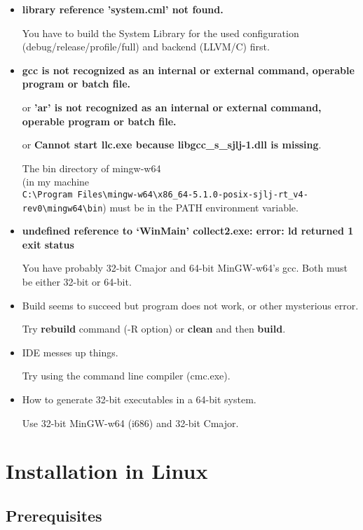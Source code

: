 \documentclass[oneside, a4paper, 11pt]{article}
\begin{document}
\begin{itemize}

\item
\textbf{library reference 'system.cml' not found.}

You have to build the System Library for the used configuration (debug/release/profile/full) and backend (LLVM/C) first.

\item

\textbf{gcc is not recognized as an internal or external command, operable program or batch file.}

or \textbf{'ar' is not recognized as an internal or external command, operable program or batch file.}

or \textbf{Cannot start llc.exe because libgcc\_s\_sjlj-1.dll is missing}.

The bin directory of mingw-w64\\
(in my machine\\
\verb|C:\Program Files\mingw-w64\x86_64-5.1.0-posix-sjlj-rt_v4-rev0\mingw64\bin|)
must be in the PATH environment variable.

\item
\textbf{undefined reference to `WinMain' collect2.exe: error: ld returned 1 exit status}

You have probably 32-bit Cmajor and 64-bit MinGW-w64's gcc.
Both must be either 32-bit or 64-bit.

\item
Build seems to succeed but program does not work, or other mysterious error.

Try \textbf{rebuild} command (-R option) or \textbf{clean} and then \textbf{build}.

\item
IDE messes up things.

Try using the command line compiler (cmc.exe).

\item
How to generate 32-bit executables in a 64-bit system.

Use 32-bit MinGW-w64 (i686) and 32-bit Cmajor.
\end{itemize}

\section{Installation in Linux}

\subsection{Prerequisites}
\end{document}

